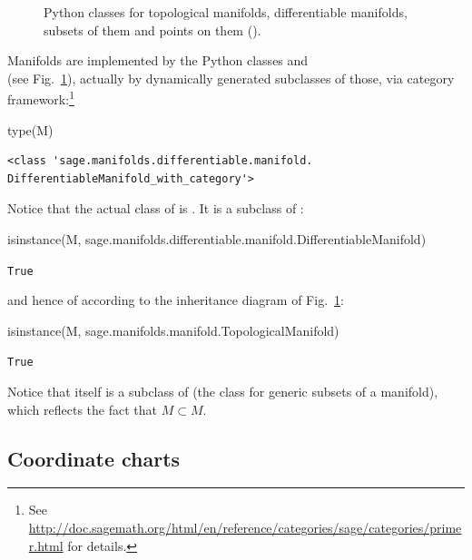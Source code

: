 \begin{figure}
\begin{center}

\end{center}
\caption{\label{f:man:domain_classes}\footnotesize
Python classes for topological
manifolds, differentiable manifolds, subsets of them
and points on them ().}
\end{figure}


Manifolds are implemented by the Python classes 
and \\  (see Fig.~\ref{f:man:domain_classes}),
actually by dynamically generated subclasses of those, via \Sage{} category
framework:\footnote{See \url{http://doc.sagemath.org/html/en/reference/categories/sage/categories/primer.html} for details.}
\begin{NBin}
type(M)
\end{NBin}
\begin{NBout}
\begin{verbatim}
<class 'sage.manifolds.differentiable.manifold.
DifferentiableManifold_with_category'>
\end{verbatim}
\end{NBout}
Notice that the actual class of  is .
It is a subclass of :
\begin{NBin}
isinstance(M,
           sage.manifolds.differentiable.manifold.DifferentiableManifold)
\end{NBin}
\begin{NBout}
\texttt{True}
\end{NBout}
and hence of
 according to the inheritance diagram of Fig.~\ref{f:man:domain_classes}:
\begin{NBin}
isinstance(M, sage.manifolds.manifold.TopologicalManifold)
\end{NBin}
\begin{NBout}
\texttt{True}
\end{NBout}
Notice that  itself is a subclass of  (the class
for generic subsets of a manifold), which reflects the fact that $M\subset M$.

\subsection{Coordinate charts} \label{s:man:coord_chart}

